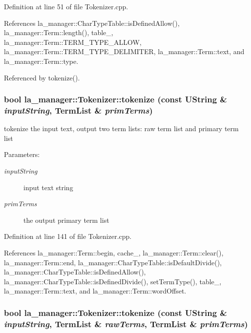 Definition at line 51 of file Tokenizer.cpp.

References la\_\-manager::CharTypeTable::isDefinedAllow(), la\_\-manager::Term::length(), table\_\-, la\_\-manager::Term::TERM\_\-TYPE\_\-ALLOW, la\_\-manager::Term::TERM\_\-TYPE\_\-DELIMITER, la\_\-manager::Term::text, and la\_\-manager::Term::type.

Referenced by tokenize().\hypertarget{classla__manager_1_1Tokenizer_85c27e7cbe95a00494c5be6e229ed5b6}{
\subsubsection[{tokenize}]{\setlength{\rightskip}{0pt plus 5cm}bool la\_\-manager::Tokenizer::tokenize (const UString \& {\em inputString}, \/  {\bf TermList} \& {\em primTerms})}}
\label{classla__manager_1_1Tokenizer_85c27e7cbe95a00494c5be6e229ed5b6}


tokenize the input text, output two term lists: raw term list and primary term list 

\begin{Desc}
\item[Parameters:]
\begin{description}
\item[{\em inputString}]input text string \item[{\em primTerms}]the output primary term list \end{description}
\end{Desc}


Definition at line 141 of file Tokenizer.cpp.

References la\_\-manager::Term::begin, cache\_\-, la\_\-manager::Term::clear(), la\_\-manager::Term::end, la\_\-manager::CharTypeTable::isDefaultDivide(), la\_\-manager::CharTypeTable::isDefinedAllow(), la\_\-manager::CharTypeTable::isDefinedDivide(), setTermType(), table\_\-, la\_\-manager::Term::text, and la\_\-manager::Term::wordOffset.\hypertarget{classla__manager_1_1Tokenizer_022320db1be5f36438cba009f23f8006}{
\subsubsection[{tokenize}]{\setlength{\rightskip}{0pt plus 5cm}bool la\_\-manager::Tokenizer::tokenize (const UString \& {\em inputString}, \/  {\bf TermList} \& {\em rawTerms}, \/  {\bf TermList} \& {\em primTerms})}}
\label{classla__manager_1_1Tokenizer_022320db1be5f36438cba009f23f8006}


